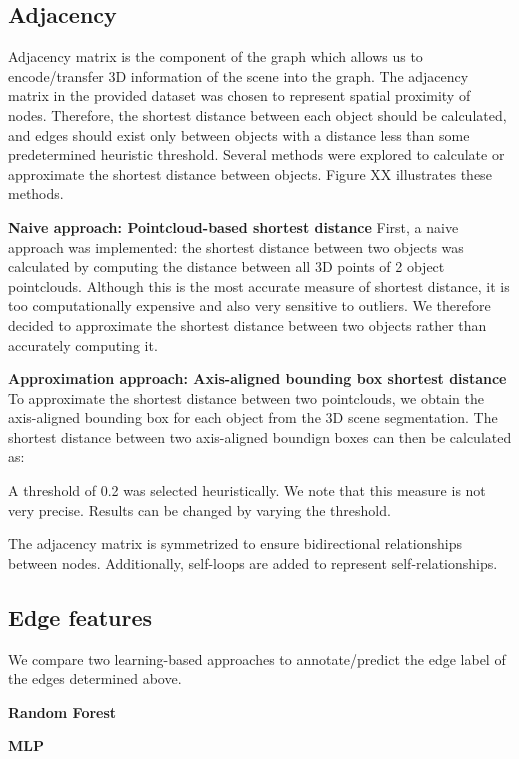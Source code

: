 \subsection{Adjacency}
Adjacency matrix is the component of the graph which allows us to encode/transfer 3D information of the scene into the graph. The adjacency matrix in the provided dataset was chosen to represent spatial proximity of nodes. Therefore, the shortest distance between each object should be calculated, and edges should exist only between objects with a distance less than some predetermined heuristic threshold. Several methods were explored to calculate or approximate the shortest distance between objects.
Figure XX illustrates these methods.

\bigskip
\noindent
\textbf{Naive approach: Pointcloud-based shortest distance}
First, a naive approach was implemented: the shortest distance between two objects was calculated by computing the distance between all 3D points of 2 object pointclouds. Although this is the most accurate measure of shortest distance, it is too computationally expensive and also very sensitive to outliers. We therefore decided to approximate the shortest distance between two objects rather than accurately computing it.

\bigskip
\noindent
\textbf{Approximation approach: Axis-aligned bounding box shortest distance}
To approximate the shortest distance between two pointclouds, we obtain the axis-aligned bounding box for each object from the 3D scene segmentation. The shortest distance between two axis-aligned boundign boxes can then be calculated as:


A threshold of 0.2 was selected heuristically. We note that this measure is not very precise. Results can be changed by varying the threshold.

The adjacency matrix is symmetrized to ensure bidirectional relationships between nodes. Additionally, self-loops are added to represent self-relationships.

\subsection{Edge features}
We compare two learning-based approaches to annotate/predict the edge label of the edges determined above.

\bigskip
\noindent
\textbf{Random Forest}

\bigskip
\noindent
\textbf{MLP}






